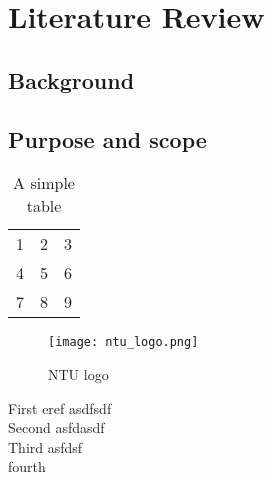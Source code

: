 \chapter{Literature Review}
\section{Background}
\section{Purpose and scope }


\begin{table}[h!]
  \begin{center}
    \begin{tabular}{| l c r |}
    \hline
    1 & 2 & 3 \\
    4 & 5 & 6 \\
    7 & 8 & 9 \\
    \hline
    \end{tabular}
  \end{center}
  \caption{A simple table}
\end{table}

\begin{figure}[h!]  
  \centering
    \texttt{[image: ntu\_logo.png]}
  \caption{NTU logo}
\end{figure}


First eref \cite{Hao14} asdfsdf \\

Second \cite{Beyl11} asfdasdf \\

Third \cite{Bona05} asfdsf\\

fourth \cite{Ohi91} \\
